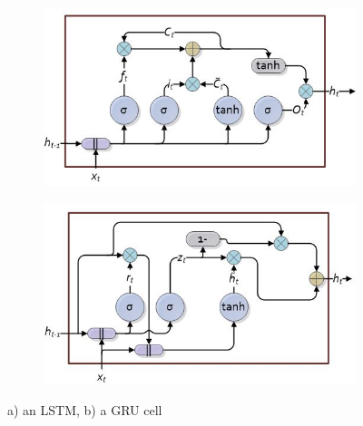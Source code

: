 \documentclass[10pt,twocolumn,letterpaper]{article}
\begin{document}
\begin{figure}[h]
	\begin{center}
		\begin{subfigure}{.45\textwidth}
			\includegraphics[width=\linewidth, height=.2\textheight]{lstm_cell2}
			\caption{}
			\label{fig:lstm_cell} 
		\end{subfigure}
		
		\begin{subfigure}{.45\textwidth}
			\includegraphics[width=\linewidth, height=.2\textheight]{gru_cell2}
			\caption{}
			\label{fig:gru_cell} 
		\end{subfigure}
	\end{center}
	\caption{a) an LSTM, b) a GRU cell}
	\label{fig:lstm_gru_cells}
\end{figure}
\end{document}
